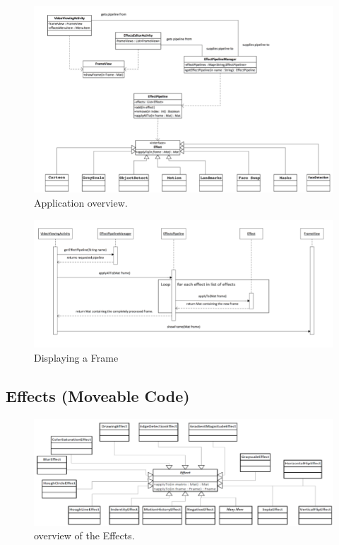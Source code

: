 \documentclass{sig-alternate}
\begin{document}
\begin{figure}[H]
\noindent \includegraphics[scale=.3]{ApplicationOverview.png}
\caption{Application overview.}
\end{figure}
\begin{figure}[H]
\noindent \includegraphics[scale=.3]{FramePipline.png}
\caption{Displaying a Frame}
\end{figure}

\subsection{Effects (Moveable Code)}
\begin{figure}[H]
\noindent \includegraphics[scale=.2]{Effects.png}
\caption{overview of the Effects.}
\end{figure}
\end{document}
